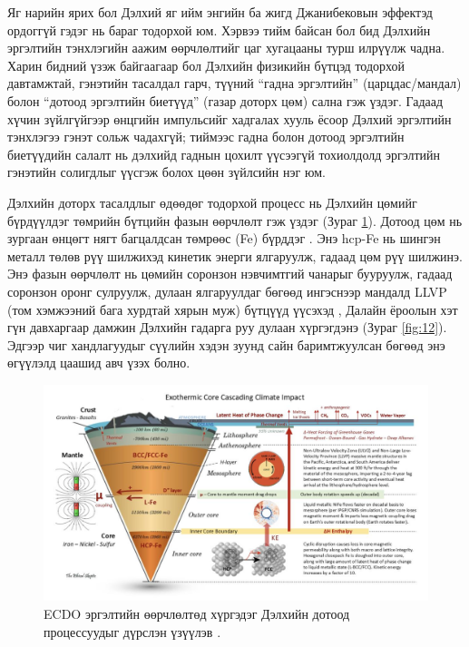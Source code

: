 \documentclass[10pt,twocolumn,letterpaper]{article}
\begin{document}
Яг нарийн ярих бол Дэлхий яг ийм энгийн ба жигд Джанибековын эффектэд ордоггүй гэдэг нь бараг тодорхой юм. Хэрвээ тийм байсан бол бид Дэлхийн эргэлтийн тэнхлэгийн аажим өөрчлөлтийг цаг хугацааны турш илрүүлж чадна. Харин бидний үзэж байгаагаар бол Дэлхийн физикийн бүтцэд тодорхой давтамжтай, гэнэтийн тасалдал гарч, түүний “гадна эргэлтийн” (царцдас/мандал) болон “дотоод эргэлтийн биетүүд” (газар доторх цөм) сална гэж үздэг. Гадаад хүчин зүйлгүйгээр өнцгийн импульсийг хадгалах хууль ёсоор Дэлхий эргэлтийн тэнхлэгээ гэнэт сольж чадахгүй; тиймээс гадна болон дотоод эргэлтийн биетүүдийн салалт нь дэлхийд гаднын цохилт үүсээгүй тохиолдолд эргэлтийн гэнэтийн солигдлыг үүсгэж болох цөөн зүйлсийн нэг юм.

Дэлхийн доторх тасалдлыг өдөөдөг тодорхой процесс нь Дэлхийн цөмийг бүрдүүлдэг төмрийн бүтцийн фазын өөрчлөлт гэж үздэг (Зураг \ref{fig:11}). Дотоод цөм нь зургаан өнцөгт нягт багцалдсан төмрөөс (Fe) бүрддэг \cite{141}. Энэ hcp-Fe нь шингэн металл төлөв рүү шилжихэд кинетик энерги ялгаруулж, гадаад цөм рүү шилжинэ. Энэ фазын өөрчлөлт нь цөмийн соронзон нэвчимтгий чанарыг бууруулж, гадаад соронзон оронг сулруулж, дулаан ялгаруулдаг бөгөөд ингэснээр мандалд LLVP (том хэмжээний бага хурдтай хярын муж) бүтцүүд үүсэхэд \cite{38}, Далайн ёроолын хэт гүн давхаргаар дамжин Дэлхийн гадарга руу дулаан хүргэгдэнэ (Зураг \ref{fig:12}). Эдгээр чиг хандлагуудыг сүүлийн хэдэн зуунд сайн баримтжуулсан бөгөөд энэ өгүүлэлд цаашид авч үзэх болно.

\begin{figure}[t]
\begin{center}
\includegraphics[width=1\textwidth]{layers.jpg}
\end{center}
   \caption{ECDO эргэлтийн өөрчлөлтөд хүргэдэг Дэлхийн дотоод процессуудыг дүрслэн үзүүлэв \cite{129}.}
\label{fig:11}

\end{figure}
\end{document}
